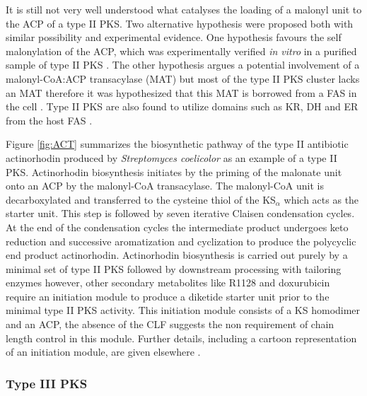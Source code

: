 			It is still not very well understood what catalyses the loading of a malonyl unit to the ACP of a type II PKS. Two alternative hypothesis were proposed both with similar possibility and experimental evidence. One hypothesis favours the self malonylation of the ACP, which was experimentally verified \textit{in vitro} in a purified sample of type II PKS \parencite{Arthur2005}. The other hypothesis argues a potential involvement of a malonyl-CoA:ACP transacylase  (MAT) but most of the type II PKS cluster lacks an MAT therefore it was hypothesized that this MAT is borrowed from a FAS in the cell \parencite{Dreier1999,Keatinge-Clay2003}. Type II PKS are also found to utilize domains such as KR, DH and ER from the host FAS \parencite{Tang2006a}. 
						
			Figure \ref{fig:ACT} summarizes the biosynthetic pathway of the type II antibiotic actinorhodin produced by \textit{Streptomyces coelicolor} as an example of a type II PKS. Actinorhodin biosynthesis initiates by the priming of the malonate unit onto an ACP by the malonyl-CoA transacylase. The malonyl-CoA unit is decarboxylated and transferred to the cysteine thiol of the KS$_{\alpha}$ which acts as the starter unit. This step is followed by seven iterative Claisen condensation cycles. At the end of the condensation cycles the intermediate product undergoes keto reduction and successive aromatization and cyclization to produce the polycyclic end product actinorhodin. Actinorhodin biosynthesis is carried out purely by  a minimal set of type II  PKS followed by downstream processing with tailoring enzymes however, other secondary metabolites like R1128 and doxurubicin require an initiation module to produce a diketide starter unit prior to the minimal type II PKS activity. This initiation module consists of a KS homodimer and an ACP, the absence of the CLF suggests the non requirement of chain length control in this module. Further details, including a cartoon representation of an initiation module, are given elsewhere \parencite{Das2009}.
			
			\subsubsection{Type III PKS}
			\label{sec: typeIIIPKS}

